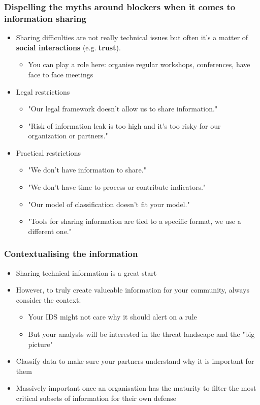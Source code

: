 \begin{frame}
\frametitle{Dispelling the myths around blockers when it comes to information sharing}
        \begin{itemize}
                \item Sharing difficulties are not really technical issues but often it's a matter of {\bf social interactions} (e.g. {\bf trust}).
		\begin{itemize}
			\item You can play a role here: organise regular workshops, conferences, have face to face meetings
		\end{itemize}
                \item Legal restrictions
                        \begin{itemize}
                                \item "Our legal framework doesn't allow us to share information."
                                \item "Risk of information leak is too high and it's too risky for our organization or partners."
                        \end{itemize}
                \item Practical restrictions
                        \begin{itemize}
                                \item "We don't have information to share."
                                \item "We don't have time to process or contribute indicators."
                                \item "Our model of classification doesn't fit your model."
                                \item "Tools for sharing information are tied to a specific format, we use a different one."
                        \end{itemize}
        \end{itemize}
\end{frame}

\begin{frame}
\frametitle{Contextualising the information}
\begin{itemize}
	\item Sharing technical information is a great start
	\item However, to truly create valueable information for your community, always consider the context:
	\begin{itemize}
		\item Your IDS might not care why it should alert on a rule
		\item But your analysts will be interested in the threat landscape and the "big picture"
	\end{itemize}
	\item Classify data to make sure your partners understand why it is important for them
	\item Massively important once an organisation has the maturity to filter the most critical subsets of information for their own defense
\end{itemize}
\end{frame}

